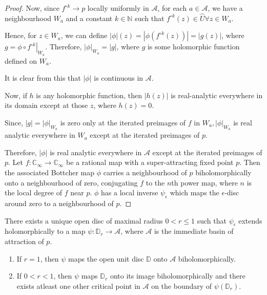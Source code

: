 \begin{proof}
Now, since $f^{\circ k} \rightarrow p$ locally uniformly in $\mathcal{A}$, for each $a \in \mathcal{A}$, we have a neighbourhood $W_{a}$ and a constant $k \in \mathbb{N}$ such that $f^{\circ k}(z) \in \hat{U} \forall z \in W_{a}$.

Hence, for $z \in W_{a}$, we can define $|\phi|(z)=\left|\phi\left(f^{\circ k}(z)\right)\right|=|g(z)|$, where $g=\left.\phi \circ f^{\circ k}\right|_{W_{a}}$. Therefore, $|\phi|_{W_{a}}=|g|$, where $g$ is some holomorphic function defined on $W_{a}$.

It is clear from this that $|\phi|$ is continuous in $\mathcal{A}$.

Now, if $h$ is any holomorphic function, then $|h(z)|$ is real-analytic everywhere in its domain except at those $z$, where $h(z)=0$.

Since, $|g|=|\phi|_{W_{a}}$ is zero only at the iterated preimages of $f$ in $W_{a},|\phi|_{W_{a}}$ is real analytic everywhere in $W_{a}$ except at the iterated preimages of $p$.

Therefore, $|\phi|$ is real analytic everywhere in $\mathcal{A}$ except at the iterated preimages of $p$. Let $f: \mathbb{C}_{\infty} \rightarrow \mathbb{C}_{\infty}$ be a rational map with a super-attracting fixed point $p$. Then the associated Bottcher map $\phi$ carries a neighbourhood of $p$ biholomorphically onto a neighbourhood of zero, conjugating $f$ to the $n$th power map, where $n$ is the local degree of $f$ near $p$. $\phi$ has a local inverse $\psi_{\epsilon}$ which maps the $\epsilon$-disc around zero to a neighbourhood of $p$.
\end{proof}

\begin{theorem} There exists a unique open disc of maximal radius $0<r \leq 1$ such that $\psi_{\epsilon}$ extends holomorphically to a map $\psi: \mathbb{D}_{r} \rightarrow \mathcal{A}$, where $\mathcal{A}$ is the immediate basin of attraction of $p$.

\begin{enumerate}
  \item If $r=1$, then $\psi$ maps the open unit disc $\mathbb{D}$ onto $\mathcal{A}$ biholomorphically.

  \item If $0<r<1$, then $\psi$ maps $\mathbb{D}_{r}$ onto its image biholomorphically and there exists atleast one other critical point in $\mathcal{A}$ on the boundary of $\psi\left(\mathbb{D}_{r}\right)$.

\end{enumerate}
\end{theorem}


